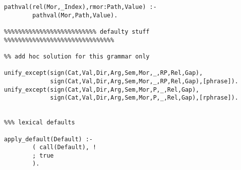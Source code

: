\begin{verbatim}
pathval(rel(Mor,_Index),rmor:Path,Value) :-
        pathval(Mor,Path,Value).
        
%%%%%%%%%%%%%%%%%%%%%%%%%% defaulty stuff %%%%%%%%%%%%%%%%%%%%%%%%%%%%%%%

%% add hoc solution for this grammar only

unify_except(sign(Cat,Val,Dir,Arg,Sem,Mor,_,RP,Rel,Gap),
             sign(Cat,Val,Dir,Arg,Sem,Mor,_,RP,Rel,Gap),[phrase]).
unify_except(sign(Cat,Val,Dir,Arg,Sem,Mor,P,_,Rel,Gap),
             sign(Cat,Val,Dir,Arg,Sem,Mor,P,_,Rel,Gap),[rphrase]).
             
        
%%% lexical defaults 

apply_default(Default) :-               
        ( call(Default), !
        ; true
        ).

        
\end{verbatim}
